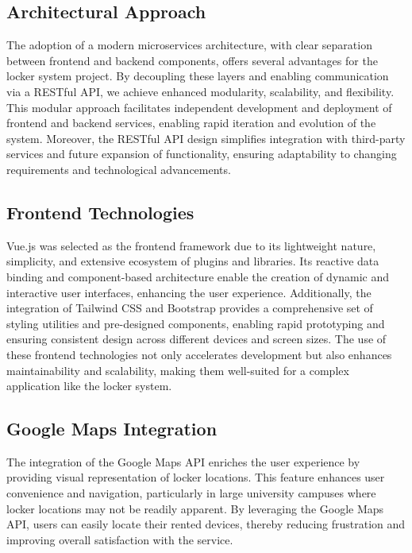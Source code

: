 \subsection{Architectural Approach}
The adoption of a modern microservices architecture, with clear separation between frontend and backend components, offers several advantages for the locker system project. By decoupling these layers and enabling communication via a RESTful API, we achieve enhanced modularity, scalability, and flexibility. This modular approach facilitates independent development and deployment of frontend and backend services, enabling rapid iteration and evolution of the system. Moreover, the RESTful API design simplifies integration with third-party services and future expansion of functionality, ensuring adaptability to changing requirements and technological advancements.

\subsection{Frontend Technologies}
Vue.js was selected as the frontend framework due to its lightweight nature, simplicity, and extensive ecosystem of plugins and libraries. Its reactive data binding and component-based architecture enable the creation of dynamic and interactive user interfaces, enhancing the user experience. Additionally, the integration of Tailwind CSS and Bootstrap provides a comprehensive set of styling utilities and pre-designed components, enabling rapid prototyping and ensuring consistent design across different devices and screen sizes. The use of these frontend technologies not only accelerates development but also enhances maintainability and scalability, making them well-suited for a complex application like the locker system.

\subsection{Google Maps Integration}
The integration of the Google Maps API enriches the user experience by providing visual representation of locker locations. This feature enhances user convenience and navigation, particularly in large university campuses where locker locations may not be readily apparent. By leveraging the Google Maps API, users can easily locate their rented devices, thereby reducing frustration and improving overall satisfaction with the service.

